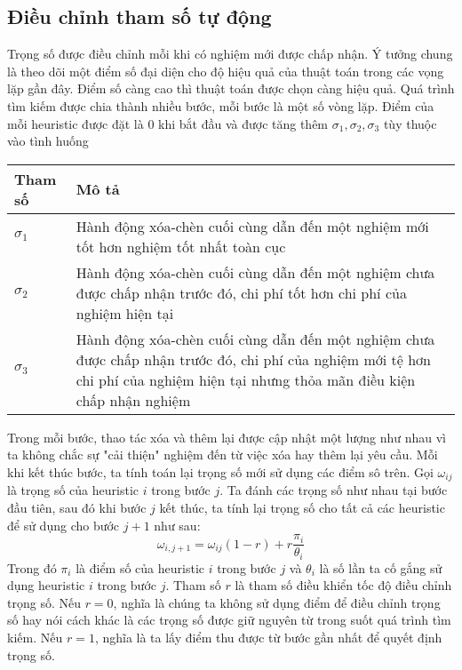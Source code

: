 \subsection{Điều chỉnh tham số tự động}
 Trọng số được điều chỉnh mỗi khi có nghiệm mới được chấp nhận. Ý tưởng chung là theo dõi một điểm số đại diện cho độ hiệu quả của thuật toán trong các vọng lặp gần đây. Điểm số càng cao thì thuật toán được chọn càng hiệu quả. Quá trình tìm kiếm được chia thành nhiều bước, mỗi bước là một số vòng lặp. Điểm của mỗi heuristic được đặt là $0$ khi bắt đầu và được tăng thêm $\sigma_1, \sigma_2, \sigma_3$ tùy thuộc vào tình huống
\begin{table}[caption={Tham số cập nhật trọng số}, label=tab:weight]
  \begin{tabularx}{\textwidth}{|l|X|}
    \hline
    Tham số & Mô tả \\ \hline
    $\sigma_1$ & Hành động xóa-chèn cuối cùng dẫn đến một nghiệm mới tốt hơn nghiệm tốt nhất toàn cục \\ \hline 
    $\sigma_2$ & Hành động xóa-chèn cuối cùng dẫn đến một nghiệm chưa được chấp nhận trước đó, chi phí tốt hơn chi phí của nghiệm hiện tại \\ \hline
    $\sigma_3$ & Hành động xóa-chèn cuối cùng dẫn đến một nghiệm chưa được chấp nhận trước đó, chi phí của nghiệm mới tệ hơn chi phí của nghiệm hiện tại nhưng thỏa mãn điều kiện chấp nhận nghiệm \\ \hline
    \end{tabularx}
\end{table}
Trong mỗi bước, thao tác xóa và thêm lại được cập nhật một lượng như nhau vì ta không chắc sự "cải thiện" nghiệm đến từ việc xóa hay thêm lại yêu cầu. Mỗi khi kết thúc bước, ta tính toán lại trọng số mới sử dụng các điểm sô trên. Gọi $\omega_{ij}$ là trọng số của heuristic $i$ trong bước $j$. Ta đánh các trọng số như nhau tại bước đầu tiên, sau đó khi bước $j$ kết thúc, ta tính lại trọng số cho tất cả các heuristic để sử dụng cho bước $j+1$ như sau:
\begin{equation}
  \label{eq:adaptive_weight}
  \omega_{i, j+1} = \omega_{ij}(1-r)+r\frac{\pi_i}{\theta_i}
\end{equation}
Trong đó $\pi_i$ là điểm số của heuristic $i$ trong bước $j$ và $\theta_i$ là số lần ta cố gắng sử dụng heuristic $i$ trong bước $j$. Tham số $r$ là tham số điều khiển tốc độ điều chỉnh trọng số. Nếu $r=0$, nghĩa là chúng ta không sử dụng điểm để điều chỉnh trọng số hay nói cách khác là các trọng số được giữ nguyên từ trong suốt quá trình tìm kiếm. Nếu $r=1$, nghĩa là ta lấy điểm thu được từ bước gần nhất để quyết định trọng số. 

